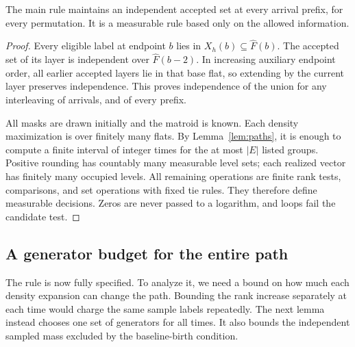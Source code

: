 \begin{lemma}\label{lem:feasibility}
The main rule maintains an independent accepted set at every arrival
prefix, for every permutation. It is a measurable rule based only on the
allowed information.
\end{lemma}
\begin{proof}
Every eligible label at endpoint $b$ lies in
$X_h(b)\subseteq\widehat F(b)$. The accepted set of its layer is
independent over $\widehat F(b-2)$. In increasing auxiliary endpoint order,
all earlier accepted layers lie in that base flat, so extending by the
current layer preserves independence. This proves independence of the
union for any interleaving of arrivals, and of every prefix.

All masks are drawn initially and the matroid is known. Each density
maximization is over finitely many flats. By Lemma~\ref{lem:paths}, it is
enough to compute a finite interval of integer times for the at most
$|E|$ listed groups. Positive rounding has countably many measurable
level sets; each realized vector has finitely many occupied levels.
All remaining operations are finite rank tests, comparisons, and set
operations with fixed tie rules. They therefore define measurable
decisions. Zeros are never passed to a logarithm, and loops fail the
candidate test.
\end{proof}

\subsection{A generator budget for the entire path}

The rule is now fully specified. To analyze it, we need a bound on how
much each density expansion can change the path. Bounding the rank
increase separately at each time would charge the same sample labels
repeatedly. The next lemma instead chooses one set of generators for all
times. It also bounds the independent sampled mass excluded by the
baseline-birth condition.

